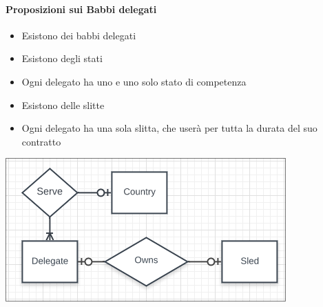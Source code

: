 \documentclass[12pt]{report}
\begin{document}
\paragraph{Proposizioni sui Babbi delegati}
\begin{itemize}
  \item Esistono dei babbi delegati
  \item Esistono degli stati
  \item Ogni delegato ha uno e uno solo stato di competenza
  \item Esistono delle slitte
  \item Ogni delegato ha una sola slitta, che userà per tutta la durata del suo contratto
\end{itemize}
\begin{center}
\includegraphics[scale=0.60]{er1.png}
\end{center}
\end{document}
